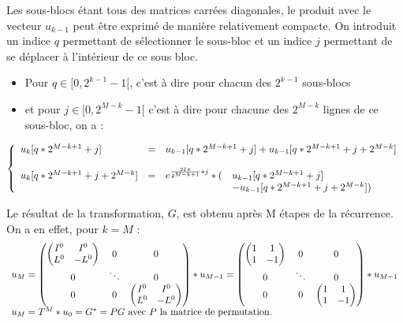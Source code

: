 \documentclass{report}
\begin{document}
		Les sous-blocs étant tous des matrices carrées diagonales, le produit avec le vecteur $u_{k-1}$ peut être exprimé de manière relativement compacte. On introduit un indice $q$ permettant de sélectionner le sous-bloc et un indice $j$ permettant de se déplacer à l'intérieur de ce sous bloc.
		\begin{itemize}
			\item Pour $q\in[0,2^{k-1}-1[$, c'est à dire pour chacun des $2^{k-1}$ sous-blocs
			\item et pour $j\in[0,2^{M-k}-1[$ c'est à dire pour chacune des $2^{M-k}$ lignes de ce sous-bloc, on a : 
		\end{itemize}
		\[
		\left \{
		\begin{array}{l l l l}
			u_k[q*2^{M-k+1} + j] 			&=&	\multicolumn{2}{l}{u_{k-1}[q*2^{M-k+1} + j] + u_{k-1}[q*2^{M-k+1} + j + 2^{M-k}] } \\
											& &																	& \\
			u_k[q*2^{M-k+1} + j + 2^{M-k}] 	&=&	 e^{{\frac{2I\pi}{2^{M-k+1}}} * j} * (						& u_{k-1}[q*2^{M-k+1} + j] \\
											& &																	& - u_{k-1}[q*2^{M-k+1} + j + 2^{M-k}])
		\end{array}
		\right .
		\]

		Le résultat de la transformation, $G$, est obtenu après M étapes de la récurrence. On a en effet, pour $k = M$ :
		\[
		\begin{array}{l l l}
			u_M = 	\begin{pmatrix}
						\begin{pmatrix}
							I^0 & I^0\\
							L^0 & -L^0
						\end{pmatrix} 			& 	0		&	0\\
						0						&	\ddots	&	0\\
						0 						& 	0 		&	\begin{pmatrix}
																	I^0 & I^0\\
																	L^0 & -L^0
																\end{pmatrix}
					\end{pmatrix} * u_{M-1}
				=  \begin{pmatrix}
						\begin{pmatrix}
							1 & 1\\
							1 & -1
						\end{pmatrix} 			& 	0		&	0\\
						0						&	\ddots	&	0\\
						0 						& 	0 		&	\begin{pmatrix}
																	1 & 1\\
																	1 & -1
																\end{pmatrix}
					\end{pmatrix} * u_{M-1}\\
			u_M = T^M * u_0 = G^* = PG \text{ avec $P$ la matrice de permutation.}
		\end{array}
		\]
\end{document}
